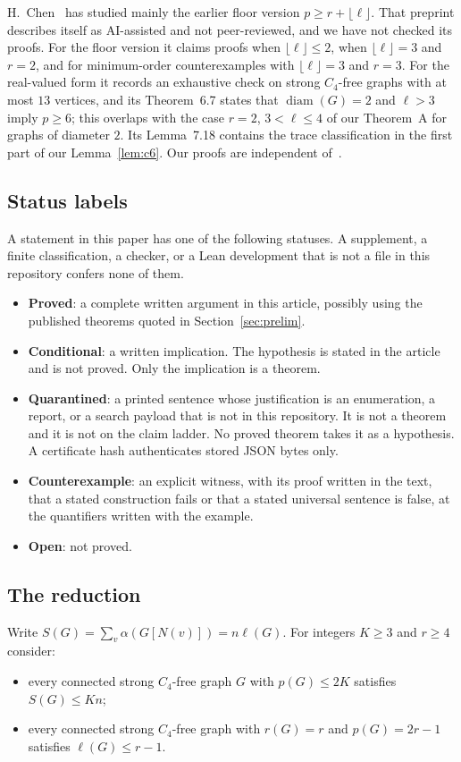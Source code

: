 \documentclass[11pt]{amsart}
\theoremstyle{definition}
\theoremstyle{remark}
\newcommand{\lr}{\ell}
\newcommand{\pp}{p}
\newcommand{\GEN}{\mathrm{GEN}}
\newcommand{\RAD}{\mathrm{RAD}}
\begin{document}
H.~Chen~\cite{chen} has studied mainly the earlier floor version $\pp\ge r+\lfloor\lr\rfloor$. That preprint describes itself as AI-assisted and not peer-reviewed, and we have not checked its proofs. For the floor version it claims proofs when $\lfloor\lr\rfloor\le2$, when $\lfloor\lr\rfloor=3$ and $r=2$, and for minimum-order counterexamples with $\lfloor\lr\rfloor=3$ and $r=3$. For the real-valued form it records an exhaustive check on strong $C_4$-free graphs with at most $13$ vertices, and its Theorem~6.7 states that $\operatorname{diam}(G)=2$ and $\lr>3$ imply $\pp\ge6$; this overlaps with the case $r=2$, $3<\lr\le4$ of our Theorem~A for graphs of diameter $2$. Its Lemma~7.18 contains the trace classification in the first part of our Lemma~\ref{lem:c6}. Our proofs are independent of~\cite{chen}.

\subsection*{Status labels}
A statement in this paper has one of the following statuses. A supplement, a finite classification, a checker, or a Lean development that is not a file in this repository confers none of them.
\begin{itemize}
\item \textbf{Proved}: a complete written argument in this article, possibly using the published theorems quoted in Section~\ref{sec:prelim}.
\item \textbf{Conditional}: a written implication. The hypothesis is stated in the article and is not proved. Only the implication is a theorem.
\item \textbf{Quarantined}: a printed sentence whose justification is an enumeration, a report, or a search payload that is not in this repository. It is not a theorem and it is not on the claim ladder. No proved theorem takes it as a hypothesis. A certificate hash authenticates stored JSON bytes only.
\item \textbf{Counterexample}: an explicit witness, with its proof written in the text, that a stated construction fails or that a stated universal sentence is false, at the quantifiers written with the example.
\item \textbf{Open}: not proved.
\end{itemize}

\subsection*{The reduction}
Write $S(G)=\sum_v\alpha(G[N(v)])=n\lr(G)$. For integers $K\ge3$ and $r\ge4$ consider:
\begin{itemize}
\item[$\GEN_K$:] every connected strong $C_4$-free graph $G$ with $\pp(G)\le2K$ satisfies $S(G)\le Kn$;
\item[$\RAD(r)$:] every connected strong $C_4$-free graph with $r(G)=r$ and $\pp(G)=2r-1$ satisfies $\lr(G)\le r-1$.
\end{itemize}
\end{document}
